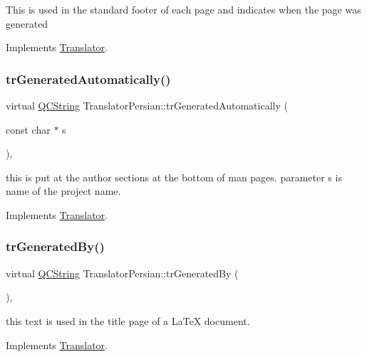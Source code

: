 This is used in the standard footer of each page and indicates when the page was generated 

Implements \mbox{\hyperlink{class_translator}{Translator}}.

\mbox{\label{class_translator_persian_a21e8f74f8ef255bbeefaa8a3bad2b32e}} 
\subsubsection{\texorpdfstring{trGeneratedAutomatically()}{trGeneratedAutomatically()}}
{\footnotesize\ttfamily virtual \mbox{\hyperlink{class_q_c_string}{Q\+C\+String}} Translator\+Persian\+::tr\+Generated\+Automatically (\begin{DoxyParamCaption}\item[{const char $\ast$}]{s }\end{DoxyParamCaption})\hspace{0.3cm}{\ttfamily [inline]}, {\ttfamily [virtual]}}

this is put at the author sections at the bottom of man pages. parameter s is name of the project name. 

Implements \mbox{\hyperlink{class_translator}{Translator}}.

\mbox{\label{class_translator_persian_a15b157e1798db76671972eaba9891f4f}} 
\subsubsection{\texorpdfstring{trGeneratedBy()}{trGeneratedBy()}}
{\footnotesize\ttfamily virtual \mbox{\hyperlink{class_q_c_string}{Q\+C\+String}} Translator\+Persian\+::tr\+Generated\+By (\begin{DoxyParamCaption}{ }\end{DoxyParamCaption})\hspace{0.3cm}{\ttfamily [inline]}, {\ttfamily [virtual]}}

this text is used in the title page of a La\+TeX document. 

Implements \mbox{\hyperlink{class_translator}{Translator}}.

